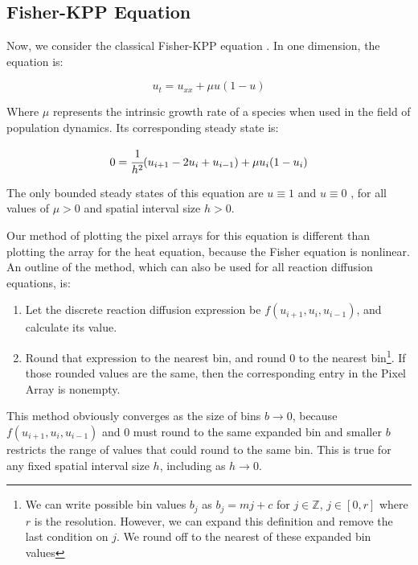 \documentclass[11pt]{article}
\begin{document}
\subsection{Fisher-KPP Equation}

Now, we consider the classical Fisher-KPP equation \citep{Fisher}. In one dimension, the equation is:

\begin{equation}
    \label{Fisher}
    u_t = u_{xx} + \mu u (1-u)
\end{equation}

\noindent Where $\mu$ represents the intrinsic growth rate of a species \citep{Numerical_RD_1} when used in the field of population dynamics. Its corresponding steady state is:

\begin{equation}
    \label{discrete Fisher}
    0 = \cfrac{1}{h^2} (u_{i+1} - 2u_i + u_{i-1}) + \mu u_i (1-u_i)
\end{equation}

\noindent The only bounded steady states of this equation are $u \equiv 1$ and $u \equiv 0$ \citep{Fisher}, for all values of $\mu > 0$ and spatial interval size $h > 0$.

Our method of plotting the pixel arrays for this equation is different than plotting the array for the heat equation, because the Fisher equation is nonlinear. An outline of the method, which can also be used for all reaction diffusion equations, is:

\begin{enumerate}
    \item Let the discrete reaction diffusion expression be $f(u_{i+1}, u_i, u_{i-1})$, and calculate its value.
    \item  Round that expression to the nearest bin, and round 0 to the nearest bin\footnote{We can write possible bin values $b_j$ as $b_j = mj + c$ for $j \in \mathbb{Z}$, $j \in [0,r]$ where $r$ is the resolution. However, we can expand this definition and remove the last condition on $j$. We round off to the nearest of these expanded bin values}. If those rounded values are the same, then the corresponding entry in the Pixel Array is nonempty.
\end{enumerate}

This method obviously converges as the size of bins $b \rightarrow 0$, because $f(u_{i+1}, u_i, u_{i-1})$ and 0 must round to the same expanded bin and smaller $b$ restricts the range of values that could round to the same bin. This is true for any fixed spatial interval size $h$, including as $h \rightarrow 0$.
\end{document}
